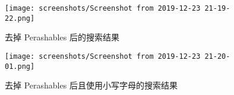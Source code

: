 \documentclass[cn,11pt, simple]{elegantbook}
\begin{document}
\begin{figure}[!htbp]
  \centering
  \texttt{[image: screenshots/Screenshot from
  2019-12-23 21-19-22.png]}
  \caption{去掉 Perashables 后的搜索结果}
  \label{fig:ludwig-result-4}
\end{figure}

\begin{figure}[!htbp]
  \centering
  \texttt{[image: screenshots/Screenshot from
  2019-12-23 21-20-01.png]}
  \caption{去掉 Perashables 后且使用小写字母的搜索结果}
  \label{fig:ludwig-result-5}
\end{figure}


%

\end{document}
